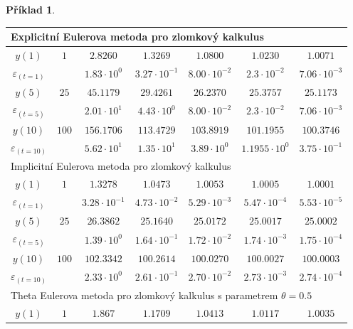 \documentclass[a4paper,12pt,twoside]{article}
\theoremstyle{definition}
\newtheorem{prikl}[veta]{Příklad}
\theoremstyle{remark}
\numberwithin{equation}{section}
\numberwithin{table}{section}
\numberwithin{figure}{section}
\begin{document}
\begin{prikl}
\begin{table}[h!]
\begin{tabular}{|c||c|c|c|c|c|c|}
		\multicolumn{7}{|l|}{Explicitní Eulerova metoda pro zlomkový kalkulus} \\
		\hline
		$y\left(1\right)$ & $1$ & $2.8260$ & $1.3269$ & $1.0800$ & $1.0230$ & $1.0071$  \\
		\hline
		$\varepsilon_{\left(t=1\right)}$ &  & $1.83 \cdot 10^{0}$ & $3.27 \cdot 10^{-1}$ & $8.00 \cdot 10^{-2}$ & $2.3\cdot 10^{-2}$ & $7.06 \cdot 10^{-3}$ \\
		\hline
		$y\left(5\right)$ & $25$ & $45.1179$ & $29.4261$ & $26.2370$ & $25.3757$ & $25.1173$  \\
		\hline
		$\varepsilon_{\left(t=5\right)}$ & & $ 2.01 \cdot 10^{1}$ & $4.43 \cdot 10^{0}$ & $8.00 \cdot 10^{-2}$ & $2.3\cdot 10^{-2}$ & $7.06 \cdot 10^{-3}$ \\
		\hline
		$y\left(10\right)$ & $100$ & $156.1706$ & $113.4729$& $103.8919$ & $101.1955$ & $100.3746$  \\
		\hline
		$\varepsilon_{\left(t=10\right)}$ & & $ 5.62 \cdot 10^{1}$ & $1.35 \cdot 10^{1}$ & $3.89 \cdot 10^{0}$ & $1.1955\cdot 10^{0}$ & $3.75 \cdot 10^{-1}$ \\
		\hline\hline
		\multicolumn{7}{|l|}{Implicitní Eulerova metoda pro zlomkový kalkulus} \\
		\hline
		$y\left(1\right)$ & $1$ & $1.3278$ & $1.0473$ & $1.0053$ & $1.0005$ & $1.0001$  \\
		\hline
		$\varepsilon_{\left(t=1\right)}$ &  & $3.28 \cdot 10^{-1}$ & $4.73 \cdot 10^{-2}$ & $5.29 \cdot 10^{-3}$ & $5.47\cdot 10^{-4}$ & $5.53\cdot 10^{-5}$ \\
		\hline
		$y\left(5\right)$ & $25$ & $26.3862$ & $25.1640$ & $25.0172$ & $25.0017$ & $25.0002$  \\
		\hline
		$\varepsilon_{\left(t=5\right)}$ & & $ 1.39 \cdot 10^{0}$ & $1.64 \cdot 10^{-1}$ & $1.72 \cdot 10^{-2}$ & $1.74\cdot 10^{-3}$ & $1.75 \cdot 10^{-4}$ \\
		\hline
		$y\left(10\right)$ & $100$ & $102.3342$ & $100.2614$ & $100.0270$ & $100.0027$ & $100.0003$  \\
		\hline
		$\varepsilon_{\left(t=10\right)}$ & & $ 2.33 \cdot 10^{0}$ & $2.61 \cdot 10^{-1}$ & $2.70 \cdot 10^{-2}$ & $2.73\cdot 10^{-3}$ & $2.74 \cdot 10^{-4}$ \\
		\hline\hline
		\multicolumn{7}{|l|}{Theta Eulerova metoda pro zlomkový kalkulus s parametrem $\theta = 0.5$} \\
		\hline
		$y\left(1\right)$ & $1$ & $1.867$ & $1.1709$ & $1.0413$ & $1.0117$ & $1.0035$  \\
		\hline

\end{tabular}
\end{table}
\end{prikl}
\end{document}
